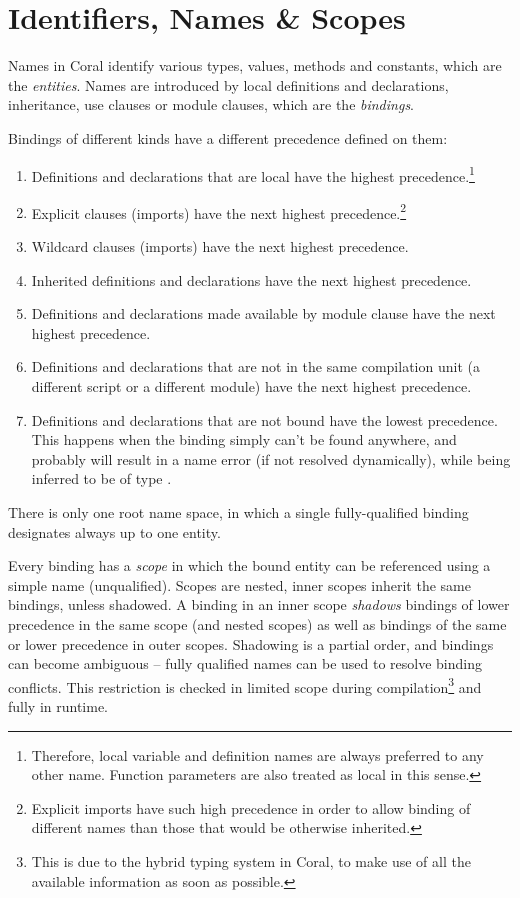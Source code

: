 
\chapter{Identifiers, Names \& Scopes}
\label{sec:identifiers-names-scopes}

Names in Coral identify various types, values, methods and constants, which are the \emph{entities}. Names are introduced by local definitions and declarations, inheritance, use clauses or module clauses, which are the \emph{bindings}. 

Bindings of different kinds have a different precedence defined on them: 

\begin{enumerate}
\item Definitions and declarations that are local have the highest precedence.\footnote{Therefore, local variable and definition names are always preferred to any other name. Function parameters are also treated as local in this sense.} 
\item Explicit \lstinline@use@ clauses (imports) have the next highest precedence.\footnote{Explicit imports have such high precedence in order to allow binding of different names than those that would be otherwise inherited.} 
\item Wildcard \lstinline@use@ clauses (imports) have the next highest precedence.
\item Inherited definitions and declarations have the next highest precedence. 
\item Definitions and declarations made available by module clause have the next highest precedence. 
\item Definitions and declarations that are not in the same compilation unit (a different script or a different module) have the next highest precedence. 
\item Definitions and declarations that are not bound have the lowest precedence. This happens when the binding simply can't be found anywhere, and probably will result in a name error (if not resolved dynamically), while being inferred to be of type \lstinline@Object@. 
\end{enumerate}

There is only one root name space, in which a single fully-qualified binding designates always up to one entity. 

Every binding has a \emph{scope} in which the bound entity can be referenced using a simple name (unqualified). Scopes are nested, inner scopes inherit the same bindings, unless shadowed. A binding in an inner scope \emph{shadows} bindings of lower precedence in the same scope (and nested scopes) as well as bindings of the same or lower precedence in outer scopes. Shadowing is a partial order, and bindings can become ambiguous -- fully qualified names can be used to resolve binding conflicts. This restriction is checked in limited scope during compilation\footnote{This is due to the hybrid typing system in Coral, to make use of all the available information as soon as possible.} and fully in runtime. 

